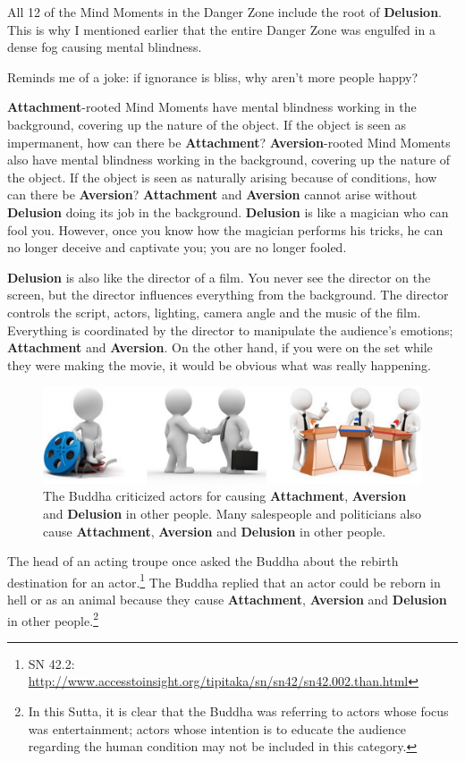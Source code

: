 All 12 of the Mind Moments in the Danger Zone include the root of \textbf{Delusion}. This is why I mentioned earlier that the entire Danger Zone was engulfed in a dense fog causing mental blindness. 

Reminds me of a joke: if ignorance is bliss, why aren’t more people happy?

\textbf{Attachment}-rooted Mind Moments have mental blindness working in the background, covering up the nature of the object. If the object is seen as impermanent, how can there be \textbf{Attachment}? \textbf{Aversion}-rooted Mind Moments also have mental blindness working in the background, covering up the nature of the object. If the object is seen as naturally arising because of conditions, how can there be \textbf{Aversion}? \textbf{Attachment} and \textbf{Aversion} cannot arise without \textbf{Delusion} doing its job in the background. \textbf{Delusion} is like a magician who can fool you. However, once you know how the magician performs his tricks, he can no longer deceive and captivate you; you are no longer fooled.

\textbf{Delusion} is also like the director of a film. You never see the director on the screen, but the director influences everything from the background. The director controls the script, actors, lighting, camera angle and the music of the film. Everything is coordinated by the director to manipulate the audience’s emotions; \textbf{Attachment} and \textbf{Aversion}. On the other hand, if you were on the set while they were making the movie, it would be obvious what was really happening.

\begin{figure}[H]
\centering
\includegraphics[width=1.0\linewidth]{./Diagrams/Actors}
\caption{The Buddha criticized actors for causing \textbf{Attachment}, \textbf{Aversion} and \textbf{Delusion} in other people. Many salespeople and politicians also cause \textbf{Attachment}, \textbf{Aversion} and \textbf{Delusion} in other people.}
\label{fig:Actors}
\end{figure}

The head of an acting troupe once asked the Buddha about the rebirth destination for an actor.\footnote{SN 42.2: \url{http://www.accesstoinsight.org/tipitaka/sn/sn42/sn42.002.than.html}} The Buddha replied that an actor could be reborn in hell or as an animal because they cause \textbf{Attachment}, \textbf{Aversion} and \textbf{Delusion} in other people.\footnote{In this Sutta, it is clear that the Buddha was referring to actors whose focus was entertainment; actors whose intention is to educate the audience regarding the human condition may not be included in this category.} 

